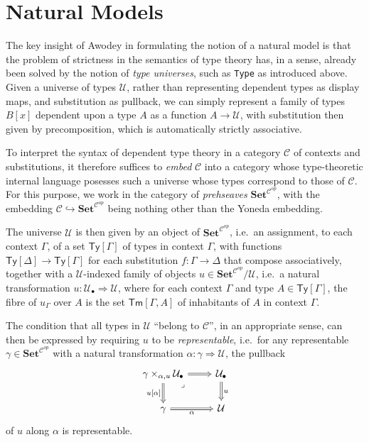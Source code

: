 \documentclass[
  11pt,
  oneside,
  article]{memoir}
\theoremstyle{definition}
\theoremstyle{plain}
\newcommand{\0}{\textsf{0}}
\newcommand{\1}{\tn{\textsf{1}}}
\begin{document}
\section{Natural Models}\label{natural-models}

The key insight of Awodey \cite{awodey2014natural} in formulating the
notion of a natural model is that the problem of strictness in the
semantics of type theory has, in a sense, already been solved by the
notion of \emph{type universes}, such as \texttt{Type} as introduced
above. Given a universe of types \(\mathcal{U}\), rather than
representing dependent types as display maps, and substitution as
pullback, we can simply represent a family of types \(B[x]\) dependent
upon a type \(A\) as a function \(A \to \mathcal{U}\), with substitution
then given by precomposition, which is automatically strictly
associative.

To interpret the syntax of dependent type theory in a category
\(\mathcal{C}\) of contexts and substitutions, it therefore suffices to
\emph{embed} \(\mathcal{C}\) into a category whose type-theoretic
internal language posesses such a universe whose types correspond to
those of \(\mathcal{C}\). For this purpose, we work in the category of
\emph{prehseaves} \(\mathbf{Set}^{\mathcal{C}^{op}}\), with the
embedding
\(\mathcal{C} \hookrightarrow \mathbf{Set}^{\mathcal{C}^{op}}\) being
nothing other than the Yoneda embedding.

The universe \(\mathcal{U}\) is then given by an object of
\(\mathbf{Set}^{\mathcal{C}^{op}}\), i.e.~an assignment, to each context
\(\Gamma\), of a set \(\mathsf{Ty}[\Gamma]\) of types in context
\(\Gamma\), with functions
\(\mathsf{Ty}[\Delta] \to \mathsf{Ty}[\Gamma]\) for each substitution
\(f : \Gamma \to \Delta\) that compose associatively, together with a
\(\mathcal{U}\)-indexed family of objects
\(u \in \mathbf{Set}^{\mathcal{C}^{op}}/\mathcal{U}\), i.e.~a natural
transformation \(u : \mathcal{U}_\bullet \Rightarrow \mathcal{U}\),
where for each context \(\Gamma\) and type
\(A \in \mathsf{Ty}[\Gamma]\), the fibre of \(u_\Gamma\) over \(A\) is
the set \(\mathsf{Tm}[\Gamma,A]\) of inhabitants of \(A\) in context
\(\Gamma\).

The condition that all types in \(\mathcal{U}\) ``belong to
\(\mathcal{C}\)'', in an appropriate sense, can then be expressed by
requiring \(u\) to be \emph{representable}, i.e.~for any representable
\(\gamma \in \mathbf{Set}^{\mathcal{C}^{op}}\) with a natural
transformation \(\alpha : \gamma \Rightarrow \mathcal{U}\), the pullback
\[
\begin{tikzcd}
    {\mathcal{\gamma} \times_{\alpha, u} \mathcal{U}_\bullet} & {\mathcal{U}_\bullet} \\
    \gamma & {\mathcal{U}}
    \arrow[Rightarrow, from=1-1, to=1-2]
    \arrow["{u[\alpha]}"', Rightarrow, from=1-1, to=2-1]
    \arrow["\lrcorner"{anchor=center, pos=0.125}, draw=none, from=1-1, to=2-2]
    \arrow["u", Rightarrow, from=1-2, to=2-2]
    \arrow["\alpha"', Rightarrow, from=2-1, to=2-2]
\end{tikzcd}
\] of \(u\) along \(\alpha\) is representable.
\end{document}

